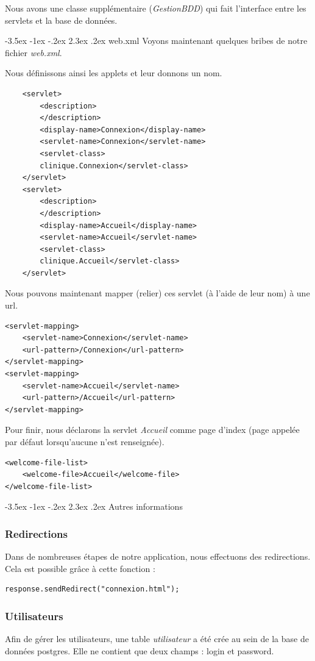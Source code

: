 \documentclass[a4paper,12pt]{article}
\makeatletter
\renewcommand\section{\@startsection {section}{1}{\z@}%
                           {-3.5ex \@plus -1ex \@minus -.2ex}%
                           {2.3ex \@plus.2ex}%
                           {\normalfont\Large\bfseries}}
\makeatother
\begin{document}
Nous avons une classe supplémentaire (\textit{GestionBDD}) qui fait l'interface entre les servlets et la base de données.

\section{web.xml}
Voyons maintenant quelques bribes de notre fichier \textit{web.xml}.


Nous définissons ainsi les applets et leur donnons un nom.
\begin{lstlisting}
	<servlet>
		<description>
		</description>
		<display-name>Connexion</display-name>
		<servlet-name>Connexion</servlet-name>
		<servlet-class>
		clinique.Connexion</servlet-class>
	</servlet>
	<servlet>
		<description>
		</description>
		<display-name>Accueil</display-name>
		<servlet-name>Accueil</servlet-name>
		<servlet-class>
		clinique.Accueil</servlet-class>
	</servlet>
\end{lstlisting}
Nous pouvons maintenant \og mapper \fg{} (relier) ces servlet (à l'aide de leur nom) à une url.
\begin{lstlisting}
<servlet-mapping>
	<servlet-name>Connexion</servlet-name>
	<url-pattern>/Connexion</url-pattern>
</servlet-mapping>
<servlet-mapping>
	<servlet-name>Accueil</servlet-name>
	<url-pattern>/Accueil</url-pattern>
</servlet-mapping>
\end{lstlisting}
Pour finir, nous déclarons la servlet \textit{Accueil} comme page d'index (page appelée par défaut lorsqu'aucune n'est renseignée).
\begin{lstlisting}
<welcome-file-list>
	<welcome-file>Accueil</welcome-file>
</welcome-file-list>
\end{lstlisting}


\section{Autres informations}
\subsubsection{Redirections}
Dans de nombreuses étapes de notre application, nous effectuons des redirections. Cela est possible grâce à cette fonction :
\begin{lstlisting}
response.sendRedirect("connexion.html");
\end{lstlisting}

\subsubsection{Utilisateurs}
Afin de gérer les utilisateurs, une table \textit{utilisateur} a été crée au sein de la base de données postgres. Elle ne contient que deux champs : login et password.
\end{document}
